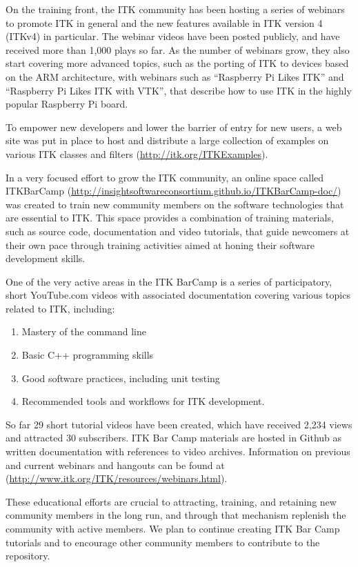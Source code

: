 \documentclass{frontiersENG} %
\begin{document}
On the training front, the ITK community has been hosting a series of webinars
to promote ITK in general and the new features available in ITK version 4
(ITKv4) in particular. The webinar videos have been posted publicly, and have
received more than 1,000 plays so far. As the number of webinars grow, they
also start covering more advanced topics, such as the porting of ITK to
devices based on the ARM architecture, with webinars such as ``Raspberry Pi
Likes ITK'' and ``Raspberry Pi Likes ITK with VTK'', that describe how to use
ITK in the highly popular Raspberry Pi board.

To empower new developers and lower the barrier of entry for new users, a web
site was put in place to host and distribute a large collection of examples on
various ITK classes and filters (\url{http://itk.org/ITKExamples}).

In a very focused effort to grow the ITK community, an online space called
ITKBarCamp (\url{http://insightsoftwareconsortium.github.io/ITKBarCamp-doc/})
was created to train new community members on the software technologies that
are essential to ITK. This space provides a combination of training materials,
such as source code, documentation and video tutorials, that guide newcomers at
their own pace through training activities aimed at honing their software
development skills.

One of the very active areas in the ITK BarCamp is a series of participatory,
short YouTube.com videos with associated documentation covering various topics
related to ITK, including:

\begin{enumerate}
\item Mastery of the command line
\item Basic C++ programming skills
\item Good software practices, including unit testing
\item Recommended tools and workflows for ITK development.
\end{enumerate}

So far 29 short tutorial videos have been created, which have received 2,234
views and attracted 30 subscribers. ITK Bar Camp materials are hosted in Github
as written documentation with references to video archives. Information on
previous and current webinars and hangouts can be found at
(\url{http://www.itk.org/ITK/resources/webinars.html}).

These educational efforts are crucial to attracting, training, and retaining
new community members in the long run, and through that mechanism replenish the
community with active members. We plan to continue creating ITK Bar Camp
tutorials and to encourage other community members to contribute to the
repository.
\end{document}
